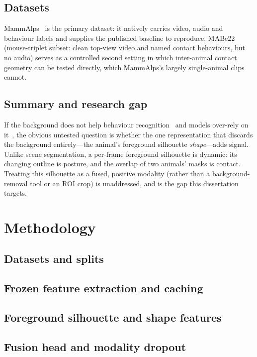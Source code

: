 \documentclass[12pt,a4paper]{report}
\begin{document}
\section{Datasets}
\label{sec:datasets}
MammAlps~\cite{mammalps} is the primary dataset: it natively carries video, audio and
behaviour labels and supplies the published baseline to reproduce. MABe22~\cite{mabe22}
(mouse-triplet subset: clean top-view video and named contact behaviours, but no audio)
serves as a controlled second setting in which inter-animal contact geometry can be tested
directly, which MammAlps's largely single-animal clips cannot.

\section{Summary and research gap}
\label{sec:gap}
If the background does not help behaviour recognition~\cite{mammalps} and models over-rely
on it~\cite{panaf}, the obvious untested question is whether the one representation that
discards the background entirely---the animal's foreground silhouette \emph{shape}---adds
signal. Unlike scene segmentation, a per-frame foreground silhouette is dynamic: its changing
outline is posture, and the overlap of two animals' masks is contact. Treating this
silhouette as a fused, positive modality (rather than a background-removal tool or an ROI
crop) is unaddressed, and is the gap this dissertation targets.

\chapter{Methodology}
\label{ch:method}
\section{Datasets and splits}
\section{Frozen feature extraction and caching}
\section{Foreground silhouette and shape features}
\section{Fusion head and modality dropout}
\end{document}
